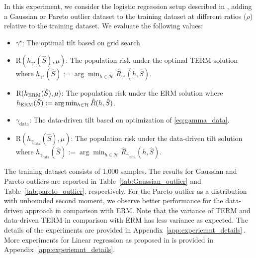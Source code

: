 \documentclass{article}
\theoremstyle{plain}
\theoremstyle{plain}
\theoremstyle{definition}
\theoremstyle{remark}
\begin{document}
In this experiment, we consider the logistic regression setup described in \citet{li2023tilted}, adding a Gaussian or Pareto outlier dataset to the training dataset at different ratios ($\rho$) relative to the training dataset. We evaluate the following values: 
\begin{itemize}[noitemsep,nolistsep,leftmargin=*]
    \item $\gamma^\star$: The optimal tilt based on grid search
    \item $\mathrm{R}(h_{\gamma^{\star}}(\hat{S}),\mu)$: The population risk under the optimal TERM solution where $h_{\gamma^{\star}}(\hat{S}):=\arg \min_{h\in\mathcal{H}}\hat{R}_{\gamma^{\star}}(h,\hat{S})$.
    \item $\mathrm{R}(h_{\text{\tiny ERM}}(\hat{S}),\mu)$: The population risk under the ERM solution where $h_{\text{\tiny ERM}}(\hat{S}):=\arg \min_{h\in\mathcal{H}}\hat{R}(h,\hat{S})$.
    \item $\gamma_{\text{data}}$: The data-driven tilt based on optimization of \eqref{eq:gamma_data}.
    \item $\mathrm{R}(h_{\gamma_{\text{data}}}(\hat S),\mu)$: The population risk under the data-driven tilt solution where $h_{\gamma_{\text{data}}}(\hat{S}):=\arg \min_{h\in\mathcal{H}}\hat{R}_{\gamma_{\text{data}}}(h,\hat{S})$.


\end{itemize}
The training dataset consists of 1,000 samples. The results for Gaussian and Pareto outliers are reported in Table~\ref{tab:Gaussian_outlier} and Table~\ref{tab:pareto_outlier}, respectively. For the Pareto-outlier as a distribution with unbounded second moment, we observe  better performance for the data-driven approach in comparison with ERM. Note that the variance of TERM and data-driven TERM in comparison with ERM has less variance as expected. The 
details of the experiments are provided in Appendix~\ref{app:experiemnt_details}\,. More experiments for Linear regression as proposed in \citep{li2020tilted} is provided in Appendix~\ref{app:experiemnt_details}. 
\end{document}
